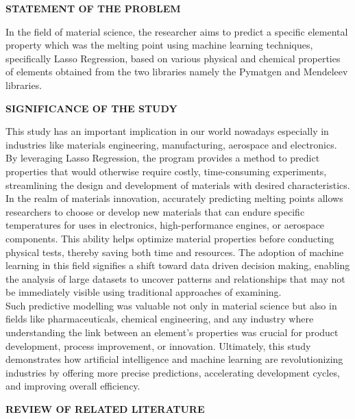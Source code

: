 \documentclass[12pt]{article}
\begin{document}
\setcounter{page}{1}

\newpage
\begin{center}
\textbf{STATEMENT OF THE PROBLEM}
\end{center}

\indent In the field of material science, the researcher aims to predict a specific elemental property which was the melting point using machine learning techniques, specifically Lasso Regression, based on various physical and chemical properties of elements obtained from the two libraries namely the Pymatgen and Mendeleev libraries. 

\vspace{0.5cm}
\begin{center}
\textbf{SIGNIFICANCE OF THE STUDY}
\end{center}

This study has an important implication in our world nowadays especially in industries like materials engineering, manufacturing, aerospace and electronics. By leveraging Lasso Regression, the program provides a method to predict properties that would otherwise require costly, time-consuming experiments, streamlining the design and development of materials with desired characteristics.\\ 
\indent In the realm of materials innovation, accurately predicting melting points allows researchers to choose or develop new materials that can endure specific temperatures for uses in electronics, high-performance engines, or aerospace components. This ability helps optimize material properties before conducting physical tests, thereby saving both time and resources. The adoption of machine learning in this field signifies a shift toward data driven decision making, enabling the analysis of large datasets to uncover patterns and relationships that may not be immediately visible using traditional approaches of examining.\\ 
\indent Such predictive modelling was valuable not only in material science but also in fields like pharmaceuticals, chemical engineering, and any industry where understanding the link between an element’s properties was crucial for product development, process improvement, or innovation. Ultimately, this study demonstrates how artificial intelligence and machine learning are revolutionizing industries by offering more precise predictions, accelerating development cycles, and improving overall efficiency.\\ 

\newpage
\begin{center}
\textbf{REVIEW OF RELATED LITERATURE}
\end{center}
\end{document}
